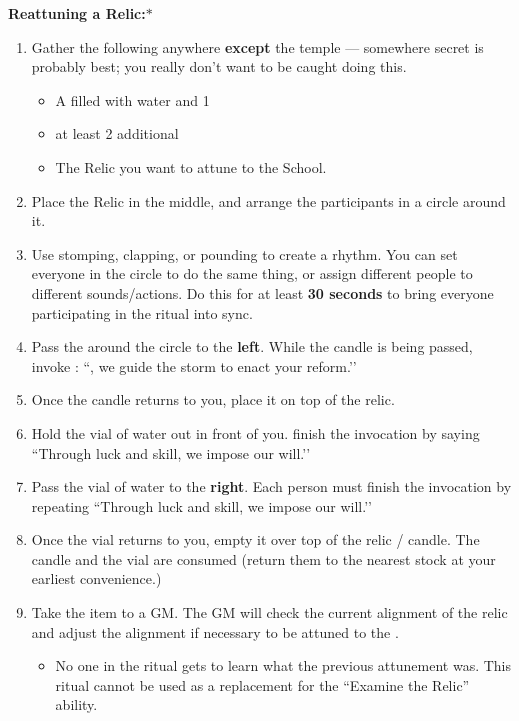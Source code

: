 \documentclass[green]{GL2020}
\begin{document}
\textbf{Reattuning a Relic:}$*$
  \begin{enumerate}
    \item Gather the following anywhere \textbf{except} the temple — somewhere secret is probably best; you really don’t want to be caught doing this.
    \begin{itemize}
      \item A \iGlassVial{} filled with water and 1 \iRitualCandle{}
      \item at least 2 additional \pGoaties{}
      \item The Relic you want to attune to the School.
    \end{itemize}
    \item Place the Relic in the middle, and arrange the participants in a circle around it. 
		\item Use stomping, clapping, or pounding to create a rhythm. You can set everyone in the circle to do the same thing, or assign different people to different sounds/actions. Do this for at least \textbf{30 seconds} to bring everyone participating in the ritual into sync.
		\item Pass the \iRitualCandle{} around the circle to the \textbf{left}. While the candle is being passed, invoke \cGenesis{}: ``\cGenesis{}, we guide the storm to enact your reform.’’
		\item Once the candle returns to you, place it on top of the relic.
		\item Hold the vial of water out in front of you. finish the invocation by saying ``Through luck and skill, we impose our will.’’
		\item Pass the vial of water to the \textbf{right}. Each person must finish the invocation by repeating ``Through luck and skill, we impose our will.’'
		\item Once the vial returns to you, empty it over top of the relic / candle. The candle and the vial are consumed (return them to the nearest stock at your earliest convenience.)
		\item Take the item to a GM. The GM will check the current alignment of the relic and adjust the alignment if necessary to be attuned to the \pSc{}.
    \begin{itemize}
      \item No one in the ritual gets to learn what the previous attunement was. This ritual cannot be used as a replacement for the ``Examine the Relic'' ability.			
    \end{itemize}
  \end{enumerate}
\end{document}
